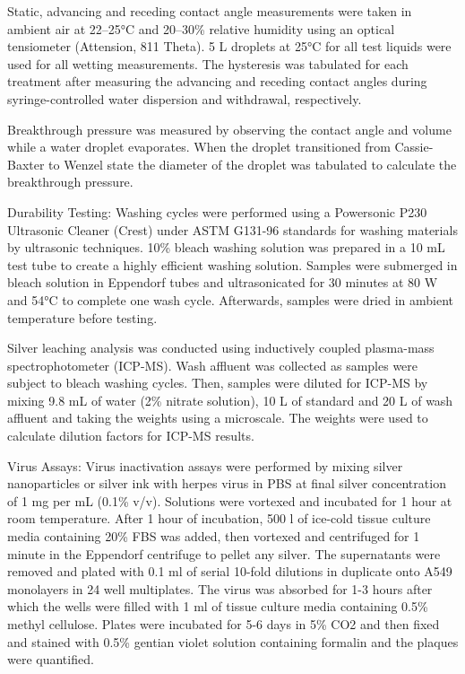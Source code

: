 \documentclass[10pt,letterpaper]{article}
\begin{document}
Static, advancing and receding contact angle measurements were taken in ambient air at 22–25°C and 20–30\% relative humidity using an optical tensiometer (Attension, 811 Theta). 5 \micro L droplets at 25°C for all test liquids were used for all wetting measurements. The hysteresis was tabulated for each treatment after measuring the advancing and receding contact angles during syringe-controlled water dispersion and withdrawal, respectively.

Breakthrough pressure was measured by observing the contact angle and volume while a water droplet evaporates. When the droplet transitioned from Cassie-Baxter to Wenzel state the diameter of the droplet was tabulated to calculate the breakthrough pressure.





Durability Testing: Washing cycles were performed using a Powersonic P230 Ultrasonic Cleaner (Crest) under ASTM G131-96 standards for washing materials by ultrasonic techniques. 10\% bleach washing solution was prepared in a 10 mL test tube to create a highly efficient washing solution. Samples were submerged in bleach solution in Eppendorf tubes and ultrasonicated for 30 minutes at 80 W and 54°C to complete one wash cycle. Afterwards, samples were dried in ambient temperature before testing.

Silver leaching analysis was conducted using inductively coupled plasma-mass spectrophotometer (ICP-MS). Wash affluent was collected as samples were subject to bleach washing cycles. Then, samples were diluted for ICP-MS by mixing 9.8 mL of water (2\% nitrate solution), 10 \micro L of standard and 20 \micro L of wash affluent and taking the weights using a microscale. The weights were used to calculate dilution factors for ICP-MS results. 


Virus Assays: Virus inactivation assays were performed by mixing silver nanoparticles or silver ink with  herpes virus in PBS at final silver concentration of 1 mg per mL (0.1\% v/v). Solutions were vortexed and incubated for 1 hour %
at room temperature. After 1 hour of incubation, 500 \micro l of ice-cold tissue culture media containing 20\% FBS was added, then vortexed and centrifuged for 1 minute in the Eppendorf centrifuge to pellet any silver. The supernatants were removed and plated with 0.1 ml of serial 10-fold dilutions in duplicate onto A549 monolayers in 24 well multiplates. The virus was absorbed for 1-3 hours after which the wells were filled with 1 ml of tissue culture media containing 0.5\% methyl cellulose.  Plates were incubated for 5-6 days in 5\% CO2 and then fixed and stained with 0.5\% gentian violet solution containing formalin and the plaques were quantified.
\end{document}

